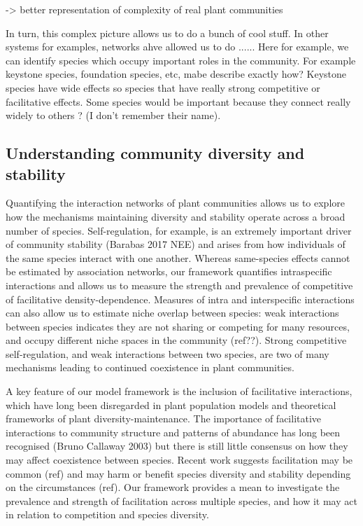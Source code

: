 \documentclass[a4,12pt]{article}
\begin{document}
    -> better representation of complexity of real plant communities
        
        In turn, this complex picture allows us to do a bunch of cool stuff. In other systems for examples, networks ahve allowed us to do ...... Here for example, we can identify species which occupy important roles in the community. For example keystone species, foundation species, etc, mabe describe exactly how? Keystone species have wide effects so species that have really strong competitive or facilitative effects. Some species would be important because they connect really widely to others ? (I don't remember their name). 


    \subsection{Understanding community diversity and stability}

        Quantifying the interaction networks of plant communities allows us to explore how the mechanisms maintaining diversity and stability operate across a broad number of species. Self-regulation, for example, is an extremely important driver of community stability (Barabas 2017 NEE) and arises from how individuals of the same species interact with one another. Whereas same-species effects cannot be estimated by association networks, our framework quantifies intraspecific interactions and allows us to measure the strength and prevalence of competitive of facilitative density-dependence. Measures of intra and interspecific interactions can also allow us to estimate niche overlap between species: weak interactions between species indicates they are not sharing or competing for many resources, and occupy different niche spaces in the community (ref??). Strong competitive self-regulation, and weak interactions between two species, are two of many mechanisms leading to continued coexistence in plant communities.

        A key feature of our model framework is the inclusion of facilitative interactions, which have long been disregarded in plant population models and theoretical frameworks of plant diversity-maintenance. The importance of facilitative interactions to community structure and patterns of abundance has long been recognised (Bruno Callaway 2003) but there is still little consensus on how they may affect coexistence between species. Recent work suggests facilitation may be common (ref) and may harm or benefit species diversity and stability depending on the circumstances (ref). Our framework provides a mean to investigate the prevalence and strength of facilitation across multiple species, and how it may act in relation to competition and species diversity. 
     
\end{document}
